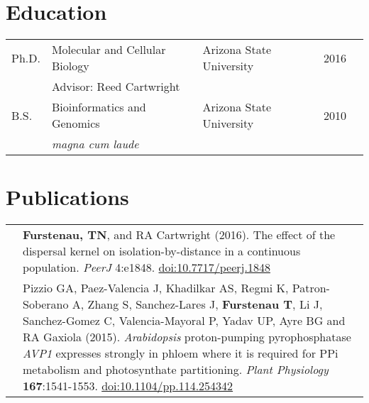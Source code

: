 \documentclass[11pt]{article}
\begin{document}
\section*{Education}
\begin{tabular}[c]{lllll}
Ph.D.& Molecular and Cellular Biology& Arizona State University&2016\\
&\multicolumn{3}{l}{Advisor: Reed Cartwright}\\
B.S.&Bioinformatics and Genomics&Arizona State University& 2010\\
&\multicolumn{3}{l}{\textit{magna cum laude}}
\end{tabular}
\section*{Publications}
\renewcommand{\arraystretch}{1.5}
\begin{tabularx}{\linewidth}{l X}
&\textbf{Furstenau, TN}, and RA Cartwright (2016). The effect of the dispersal kernel on isolation-by-distance in a continuous population. \textit{PeerJ} 4:e1848. \href{https://doi.org/10.7717/peerj.1848}{doi:10.7717/peerj.1848}\\

&Pizzio GA, Paez-Valencia J, Khadilkar AS, Regmi K, Patron-Soberano A, Zhang S, Sanchez-Lares J, \textbf{Furstenau T}, Li J, Sanchez-Gomez C, Valencia-Mayoral P, Yadav UP, Ayre BG and RA Gaxiola (2015).\textit{ Arabidopsis} proton-pumping pyrophosphatase \textit{AVP1} expresses strongly in phloem where it is required for PPi metabolism and photosynthate partitioning. \textit{Plant Physiology} \textbf{167}:1541-1553. \href{http:/​/​dx.​doi.​org/​10.​1104/​pp.​114.​254342}{doi:10.1104/pp.114.254342}\\
\end{tabularx}
\end{document}
